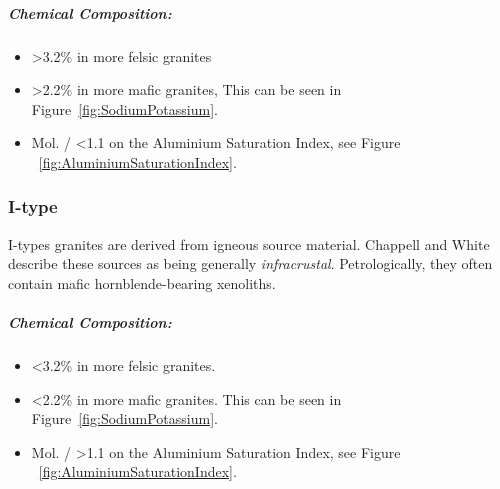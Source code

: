 \documentclass[a4paper]{article}
\begin{document}
\subparagraph{Chemical Composition:}

\begin{itemize}
\item {} \textgreater 3.2\% in more felsic granites
\item {} \textgreater 2.2\% in more mafic granites, This can be seen in Figure~\ref{fig:SodiumPotassium}.
\item Mol.  /  \textless 1.1 on the Aluminium Saturation Index, see Figure  ~\ref{fig:AluminiumSaturationIndex}.
\end{itemize}
\cite{chappell2001two}

\subsubsection{I-type}
I-types granites are derived from igneous source material. Chappell and White describe these sources as being generally \textit{infracrustal}. Petrologically, they often contain mafic hornblende-bearing xenoliths.

\subparagraph{Chemical Composition:}
\begin{itemize}
\item {} \textless 3.2\% in more felsic granites.
\item {} \textless 2.2\% in more mafic granites. This can be seen in Figure~\ref{fig:SodiumPotassium}.
\item Mol.  /  \textgreater 1.1 on the Aluminium Saturation Index, see Figure  ~\ref{fig:AluminiumSaturationIndex}.
\end{itemize}
\cite{chappell2001two}
\end{document}
